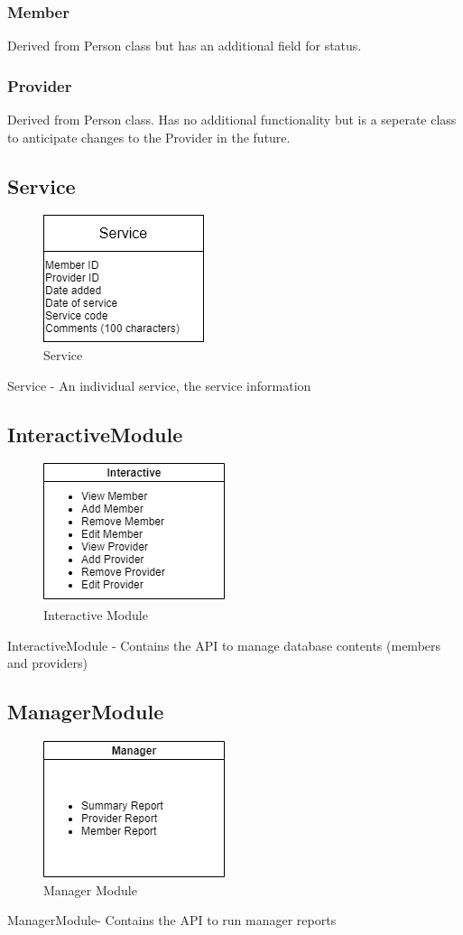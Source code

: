 \documentclass{article}
\begin{document}
\subsubsection{Member}
Derived from Person class but has an additional field for status.
\subsubsection{Provider}
Derived from Person class. Has no additional functionality but is a seperate class to anticipate changes to the Provider in the future.

\subsection{Service}
  \begin{figure}[h!]
	\centering
	\includegraphics[width=0.3\linewidth]{service.png}
	\caption[Service]{Service}
	\label{fig:P1compileP0-1}
  \end{figure}
Service - An individual service, the service information

\pagebreak

\subsection{InteractiveModule}
  \begin{figure}[h!]
	\centering
	\includegraphics[width=0.3\linewidth]{interactiveModule.png}
	\caption[Interactive Module]{Interactive Module}
	\label{fig:P1compileP0-1}
  \end{figure}
InteractiveModule - Contains the API to manage database contents (members and providers)

\subsection{ManagerModule}
  \begin{figure}[h!]
	\centering
	\includegraphics[width=0.3\linewidth]{managerModule.png}
	\caption[Manager Module]{Manager Module}
	\label{fig:P1compileP0-1}
  \end{figure}
ManagerModule- Contains the API to run manager reports
\end{document}
